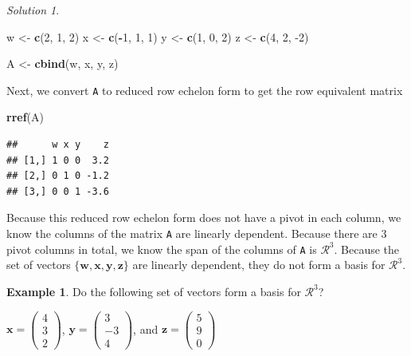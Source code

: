 \documentclass[
]{book}
\newenvironment{Shaded}{\begin{snugshade}}{\end{snugshade}}
\newcommand{\DecValTok}[1]{\textcolor[rgb]{0.00,0.00,0.81}{#1}}
\newcommand{\KeywordTok}[1]{\textcolor[rgb]{0.13,0.29,0.53}{\textbf{#1}}}
\newcommand{\NormalTok}[1]{#1}
\newcommand{\OperatorTok}[1]{\textcolor[rgb]{0.81,0.36,0.00}{\textbf{#1}}}
\newcommand{\StringTok}[1]{\textcolor[rgb]{0.31,0.60,0.02}{#1}}
\theoremstyle{definition}
\theoremstyle{definition}
\newtheorem{example}{Example}[chapter]
\theoremstyle{definition}
\theoremstyle{definition}
\theoremstyle{remark}
\newtheorem*{solution}{Solution}
\begin{document}
\begin{solution}
\begin{Shaded}
\begin{Highlighting}[]
\NormalTok{w <-}\StringTok{ }\KeywordTok{c}\NormalTok{(}\DecValTok{2}\NormalTok{, }\DecValTok{1}\NormalTok{, }\DecValTok{2}\NormalTok{)}
\NormalTok{x <-}\StringTok{ }\KeywordTok{c}\NormalTok{(}\OperatorTok{-}\DecValTok{1}\NormalTok{, }\DecValTok{1}\NormalTok{, }\DecValTok{1}\NormalTok{)}
\NormalTok{y <-}\StringTok{ }\KeywordTok{c}\NormalTok{(}\DecValTok{1}\NormalTok{, }\DecValTok{0}\NormalTok{, }\DecValTok{2}\NormalTok{)}
\NormalTok{z <-}\StringTok{ }\KeywordTok{c}\NormalTok{(}\DecValTok{4}\NormalTok{, }\DecValTok{2}\NormalTok{, }\DecValTok{-2}\NormalTok{)}

\NormalTok{A <-}\StringTok{ }\KeywordTok{cbind}\NormalTok{(w, x, y, z)}
\end{Highlighting}
\end{Shaded}

Next, we convert \texttt{A} to reduced row echelon form to get the row equivalent matrix

\begin{Shaded}
\begin{Highlighting}[]
\KeywordTok{rref}\NormalTok{(A)}
\end{Highlighting}
\end{Shaded}

\begin{verbatim}
##      w x y    z
## [1,] 1 0 0  3.2
## [2,] 0 1 0 -1.2
## [3,] 0 0 1 -3.6
\end{verbatim}

Because this reduced row echelon form does not have a pivot in each column, we know the columns of the matrix \texttt{A} are linearly dependent. Because there are 3 pivot columns in total, we know the span of the columns of \texttt{A} is \(\mathcal{R}^3\). Because the set of vectors \(\{ \mathbf{w}, \mathbf{x}, \mathbf{y}, \mathbf{z} \}\) are linearly dependent, they do not form a basis for \(\mathcal{R}^3\).
\end{solution}

\begin{example}
Do the following set of vectors form a basis for \(\mathcal{R}^3\)?

\(\mathbf{x} = \begin{pmatrix} 4 \\ 3 \\ 2 \end{pmatrix}\), \(\mathbf{y} = \begin{pmatrix} 3 \\ -3 \\ 4 \end{pmatrix}\), and \(\mathbf{z} = \begin{pmatrix} 5 \\ 9 \\ 0 \end{pmatrix}\)
\end{example}
\end{document}

